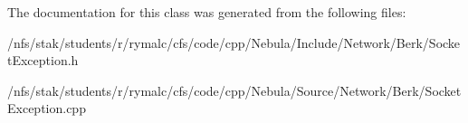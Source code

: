The documentation for this class was generated from the following files:\begin{DoxyCompactItemize}
\item 
/nfs/stak/students/r/rymalc/cfs/code/cpp/Nebula/Include/Network/Berk/SocketException.h\item 
/nfs/stak/students/r/rymalc/cfs/code/cpp/Nebula/Source/Network/Berk/SocketException.cpp\end{DoxyCompactItemize}
